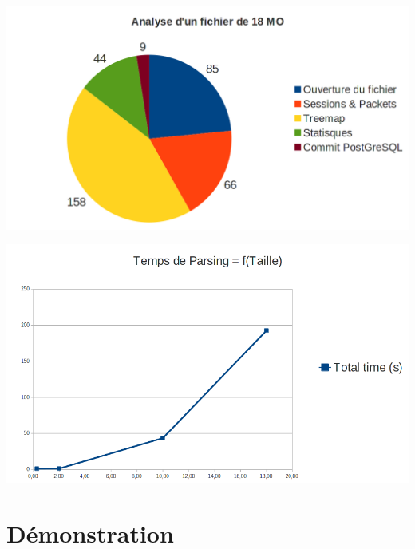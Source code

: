 \documentclass{beamer}
\begin{document}
  \begin{frame}
    \begin{center}
      \includegraphics[scale=0.3]{parse-time.png}
    \end{center} 
  \end{frame}
  
  \begin{frame}
    \begin{center}
       \includegraphics[scale=0.3]{parse-temps.png}
    \end{center} 
  \end{frame}

  
 \section{Démonstration}

\end{document}
